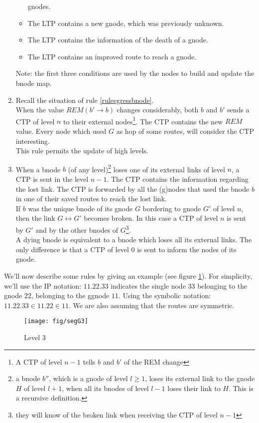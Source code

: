 \documentclass[a4paper]{article}
\begin{document}
\begin{enumerate}
\begin{itemize}
				gnodes.
			\item The LTP contains a new gnode, which was
				previously unknown.
			\item The LTP contains the information of the death of a
				gnode.
			\item The LTP contains an improved route to reach a
				gnode.
		\end{itemize}
		Note: the first three conditions are used by the nodes to
		build and update the bnode map.
	\item \label{rule6}
		Recall the situation of rule \ref{ruleegressbnode}.\\
		When the value $REM(b'\rightarrow b)$ changes
		considerably,
		both $b$ and $b'$ sends a CTP of level $n$ to their external
		nodes\footnote{A CTP of level $n-1$ tells $b$ and $b'$ of the
		REM change}. The CTP contains the new $REM$ value. Every node which used $G$ as hop of some routes,
		will consider the CTP interesting.\\
		This rule permits the update of high levels.
	\item \label{rule7}
		When a bnode $b$ (of any level)\footnote{a bnode $b''$, which is a
		gnode of level $l\ge 1$, loses its external link to the gnode
		$H$ of level $l+1$, when all its
		bnodes of level $l-1$ loses their link to $H$. This is a
		recursive definition.}
		loses one of its external links of
		level $n$, a CTP is sent in the level $n-1$.  The CTP contains
		the information regarding the lost link.
		The CTP is forwarded by all the (g)nodes that used the
		bnode $b$ in one of their saved routes to reach the lost link.\\
		If $b$ was the unique bnode of its gnode $G$
		bordering to gnode $G'$ of level $n$, then the link
		$G\leftrightarrow G'$ becomes broken. In this case a CTP of
		level $n$ is sent by $G'$ and by the other bnodes of
		$G$\footnote{they will know of the broken link when receiving
		the CTP of level $n-1$}.\\
		A dying bnode is equivalent to a bnode which loses all its
		external links. The only difference is that a CTP of level 0
		is sent to inform the nodes of its gnode.
\end{enumerate}
We'll now describe some rules by giving an example (see figure
\ref{figexq2}). For simplicity, we'll use the IP notation: $11.22.33$
indicates the single node $33$ belonging to the gnode $22$, belonging to the
ggnode $11$. Using the symbolic notation: $11.22.33 \in 11.22 \in 11$. We are
also assuming that the routes are symmetric.
\begin{figure}[h]
	\begin{center}
		\texttt{[image: fig/segG3]}
	\end{center}
	\caption{Level 3}
	\label{figexq2}
\end{figure}
\end{document}
